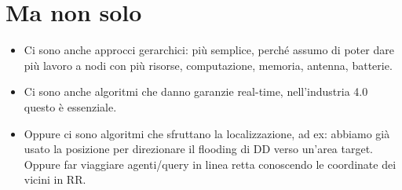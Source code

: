 \documentclass[12pt,italian]{report}
\begin{document}
\section{Ma non solo}
\label{sec:solo}
\begin{itemize}
    \item Ci sono anche approcci gerarchici: più semplice, perché assumo di poter dare più lavoro a nodi con più risorse, computazione, memoria, antenna, batterie.
    \item Ci sono anche algoritmi che danno garanzie real-time, nell'industria 4.0 questo è essenziale.
    \item Oppure ci sono algoritmi che sfruttano la localizzazione, ad ex: abbiamo già usato la posizione per direzionare il flooding di DD verso un'area target. Oppure far viaggiare agenti/query in linea retta conoscendo le coordinate dei vicini in RR.  
\end{itemize} 
\end{document}
